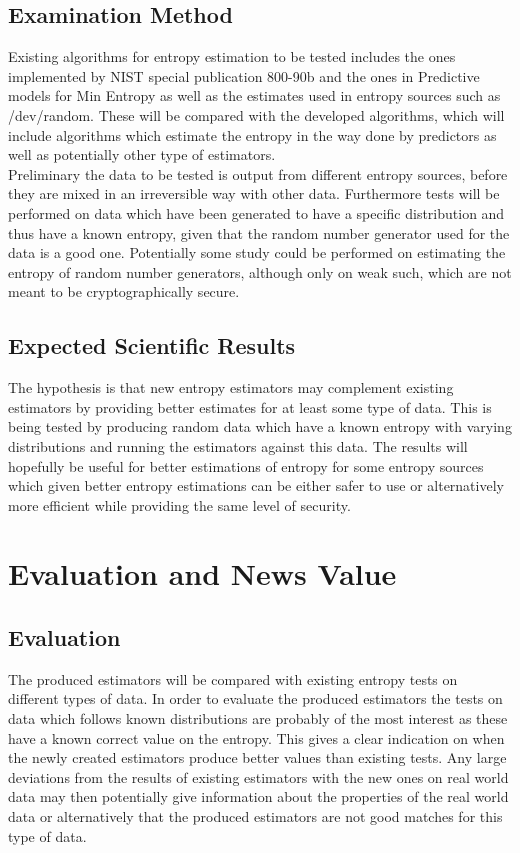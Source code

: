 \documentclass[a4paper,11pt]{report}
\begin{document}
\subsection*{Examination Method}
Existing algorithms for entropy estimation to be tested includes the ones
implemented by NIST special publication 800-90b\cite{800-90B} and the ones
in Predictive models for Min Entropy\cite{eprint-2015-26658} as well as 
the estimates used in entropy sources such as /dev/random. These will be 
compared with the developed algorithms, which will include algorithms which
estimate the entropy in the way done by predictors as well as potentially
other type of estimators. \\

\noindent
Preliminary the data to be tested is output from different entropy sources,
before they are mixed in an irreversible way with other data. Furthermore
tests will be performed on data which have been generated to have a specific
distribution and thus have a known entropy, given that the random number 
generator used for the data is a good one. Potentially some study could be
performed on estimating the entropy of random number generators, although only
on weak such, which are not meant to be cryptographically secure.
\subsection*{Expected Scientific Results}
The hypothesis is that new entropy estimators may complement existing 
estimators by providing better estimates for at least some type of data.
This is being tested by producing random data which have a known entropy
with varying distributions and running the estimators against this data. 
The results will hopefully be useful for better estimations of entropy for 
some entropy sources which given better entropy estimations can be either safer
to use or alternatively more efficient while providing the same level of 
security.

\section*{Evaluation and News Value}
\subsection*{Evaluation}
The produced estimators will be compared with existing entropy tests on
different types of data. In order to evaluate the produced estimators the tests
on data which follows known distributions are probably of the most interest as
these have a known correct value on the entropy. This gives a clear indication
on when the newly created estimators produce better values than existing tests.
Any large deviations from the results of existing estimators with the new ones
on real world data may then potentially give information about the properties
of the real world data or alternatively that the produced estimators are not 
good matches for this type of data. 
\end{document}
